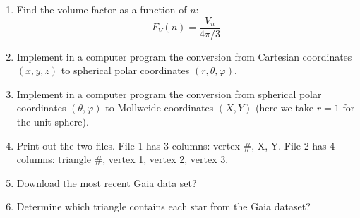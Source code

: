 \documentclass[author-year, prd, amsmath, amssymb, longbibliography, floatfix, reprint, superscriptaddress, a4]{revtex4-1}
\begin{document}
\begin{enumerate}
\item Find the volume factor as a function of \(n\):
$$F_{V}(n) = \frac{V_{n}}{4 \pi / 3}$$

\item Implement in a computer program the conversion from Cartesian coordinates \((x, y, z)\) to spherical polar coordinates \((r, \theta, \varphi)\).

\item Implement in a computer program the conversion from spherical polar coordinates \((\theta, \varphi)\) to Mollweide coordinates \((X, Y)\) (here we take \(r = 1\) for the unit sphere).

\item Print out the two files. File 1 has 3 columns: {vertex #, X, Y}. File 2 has 4 columns: {triangle #, vertex 1, vertex 2, vertex 3}.

\item Download the most recent Gaia data set?

\item Determine which triangle contains each star from the Gaia dataset?

\end{enumerate}
\end{document}
